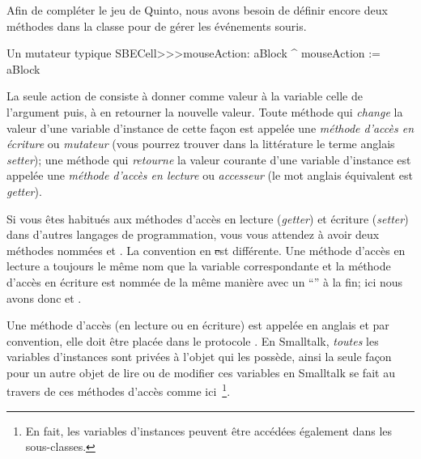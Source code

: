 \documentclass[a4paper,10pt,twoside]{book}
\begin{document}
Afin de compléter le jeu de Quinto, nous avons besoin de définir encore deux méthodes dans la classe  pour de gérer les événements souris.
\begin{method}[mouseAction:]{Un mutateur typique}
SBECell>>>mouseAction: aBlock
   ^ mouseAction := aBlock
\end{method}

La seule action de  consiste à donner comme
valeur à la variable  celle de l'argument puis, à en
retourner la nouvelle valeur. Toute méthode qui \emph{change} la
valeur d'une variable d'instance de cette façon est appelée une
\emph{méthode d'accès en écriture} ou \emph{mutateur} (vous pourrez
trouver dans la littérature le terme anglais \emph{setter}); une
méthode qui \emph{retourne} la valeur courante d'une variable
d'instance est appelée une \emph{méthode d'accès en lecture} ou
\emph{accesseur} (le mot anglais équivalent est \emph{getter}).

Si vous \^etes habitués aux méthodes d'accès en lecture (\emph{getter})
et écriture (\emph{setter}) dans d'autres langages de programmation,
vous vous attendez à avoir deux méthodes nommées 
et .
La convention en \st est différente.
Une méthode d'accès en lecture a toujours le m\^eme nom que la variable
correspondante et la méthode d'accès en écriture est nommée de la m\^eme
manière avec un ``\ct{:}'' à la fin; ici nous avons donc
 et .

Une méthode d'accès (en lecture ou en écriture) est appelée
en anglais  et par convention, elle doit \^etre
placée dans le protocole .
En Smalltalk, \emph{toutes} les variables d'instances sont privées à
l'objet qui les possède, ainsi la seule façon pour un autre objet de
lire ou de modifier ces variables en Smalltalk se fait au travers de
ces méthodes d'accès comme ici~\footnote{En fait, les variables
  d'instances peuvent \^etre accédées également dans les sous-classes.}.
\end{document}
